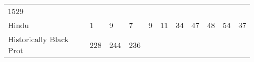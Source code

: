 \documentclass[]{article}
\begin{document}
\begin{longtable}[]{@{}lllllllllll@{}}
\begin{minipage}[t]{0.11\columnwidth}
1529\strut
\end{minipage}\tabularnewline
\begin{minipage}[t]{0.14\columnwidth}\raggedright\strut
Hindu\strut
\end{minipage} & \begin{minipage}[t]{0.04\columnwidth}\raggedright\strut
1\strut
\end{minipage} & \begin{minipage}[t]{0.05\columnwidth}\raggedright\strut
9\strut
\end{minipage} & \begin{minipage}[t]{0.05\columnwidth}\raggedright\strut
7\strut
\end{minipage} & \begin{minipage}[t]{0.05\columnwidth}\raggedright\strut
9\strut
\end{minipage} & \begin{minipage}[t]{0.05\columnwidth}\raggedright\strut
11\strut
\end{minipage} & \begin{minipage}[t]{0.05\columnwidth}\raggedright\strut
34\strut
\end{minipage} & \begin{minipage}[t]{0.06\columnwidth}\raggedright\strut
47\strut
\end{minipage} & \begin{minipage}[t]{0.06\columnwidth}\raggedright\strut
48\strut
\end{minipage} & \begin{minipage}[t]{0.04\columnwidth}\raggedright\strut
54\strut
\end{minipage} & \begin{minipage}[t]{0.11\columnwidth}\raggedright\strut
37\strut
\end{minipage}\tabularnewline
\begin{minipage}[t]{0.14\columnwidth}\raggedright\strut
Historically Black Prot\strut
\end{minipage} & \begin{minipage}[t]{0.04\columnwidth}\raggedright\strut
228\strut
\end{minipage} & \begin{minipage}[t]{0.05\columnwidth}\raggedright\strut
244\strut
\end{minipage} & \begin{minipage}[t]{0.05\columnwidth}\raggedright\strut
236\strut
\end{minipage} & \begin{minipage}[t]{0.05\columnwidth}\raggedright\strut

\end{minipage}
\end{longtable}
\end{document}
